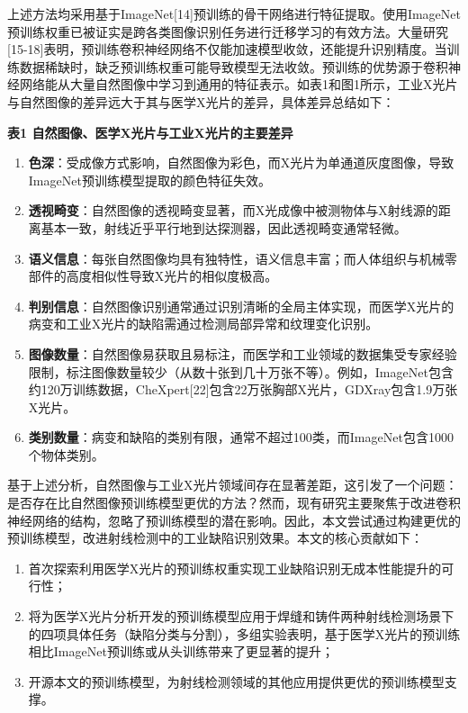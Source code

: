 上述方法均采用基于ImageNet{[}14{]}预训练的骨干网络进行特征提取。使用ImageNet预训练权重已被证实是跨各类图像识别任务进行迁移学习的有效方法。大量研究{[}15-18{]}表明，预训练卷积神经网络不仅能加速模型收敛，还能提升识别精度。当训练数据稀缺时，缺乏预训练权重可能导致模型无法收敛。预训练的优势源于卷积神经网络能从大量自然图像中学习到通用的特征表示。如表1和图1所示，工业X光片与自然图像的差异远大于其与医学X光片的差异，具体差异总结如下：

\textbf{表1 自然图像、医学X光片与工业X光片的主要差异}

\begin{enumerate}
	\def\labelenumi{\arabic{enumi}.}
	\item
	\textbf{色深}：受成像方式影响，自然图像为彩色，而X光片为单通道灰度图像，导致ImageNet预训练模型提取的颜色特征失效。
	\item
	\textbf{透视畸变}：自然图像的透视畸变显著，而X光成像中被测物体与X射线源的距离基本一致，射线近乎平行地到达探测器，因此透视畸变通常轻微。
	\item
	\textbf{语义信息}：每张自然图像均具有独特性，语义信息丰富；而人体组织与机械零部件的高度相似性导致X光片的相似度极高。
	\item
	\textbf{判别信息}：自然图像识别通常通过识别清晰的全局主体实现，而医学X光片的病变和工业X光片的缺陷需通过检测局部异常和纹理变化识别。
	\item
	\textbf{图像数量}：自然图像易获取且易标注，而医学和工业领域的数据集受专家经验限制，标注图像数量较少（从数十张到几十万张不等）。例如，ImageNet包含约120万训练数据，CheXpert{[}22{]}包含22万张胸部X光片，GDXray包含1.9万张X光片。
	\item
	\textbf{类别数量}：病变和缺陷的类别有限，通常不超过100类，而ImageNet包含1000个物体类别。
\end{enumerate}

基于上述分析，自然图像与工业X光片领域间存在显著差距，这引发了一个问题：是否存在比自然图像预训练模型更优的方法？然而，现有研究主要聚焦于改进卷积神经网络的结构，忽略了预训练模型的潜在影响。因此，本文尝试通过构建更优的预训练模型，改进射线检测中的工业缺陷识别效果。本文的核心贡献如下：

\begin{enumerate}
	\def\labelenumi{\arabic{enumi}.}
	\item
	首次探索利用医学X光片的预训练权重实现工业缺陷识别无成本性能提升的可行性；
	\item
	将为医学X光片分析开发的预训练模型应用于焊缝和铸件两种射线检测场景下的四项具体任务（缺陷分类与分割），多组实验表明，基于医学X光片的预训练相比ImageNet预训练或从头训练带来了更显著的提升；
	\item
	开源本文的预训练模型，为射线检测领域的其他应用提供更优的预训练模型支撑。
\end{enumerate}

